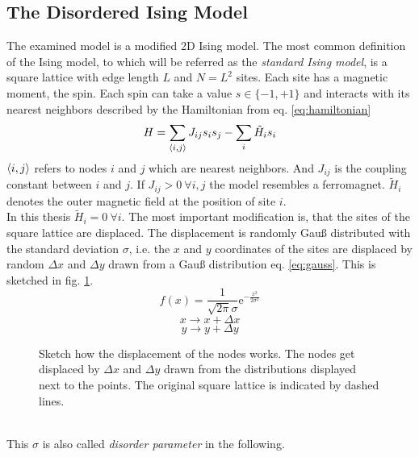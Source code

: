 \subsection{The Disordered Ising Model}
\label{ssec:isingmodel}
    The examined model is a modified 2D Ising model.
    The most common definition of the Ising model, to which will be referred
    as the \emph{standard Ising model}, is a square lattice with edge length \(L\) and
    \(N=L^2\) sites. Each site has a magnetic moment, the spin. Each
    spin can take a value \(s \in \{-1,+1\}\) and interacts with its
    nearest neighbors described by the Hamiltonian from eq. \eqref{eq:hamiltonian}
    \begin{equation}
        H = \sum_{\left< i,j \right>}J_{ij}s_{i}s_{j} - \sum_i \tilde{H}_i s_i
        \label{eq:hamiltonian}
    \end{equation}
    \(\left< i,j \right>\) refers to nodes \(i\) and \(j\) which are nearest
    neighbors. And \(J_{ij}\) is the coupling constant between \(i\) and
    \(j\). If \(J_{ij} > 0 \ \forall i,j\) the model resembles a ferromagnet.
    \(\tilde{H}_i\) denotes the outer magnetic field at the position of
    site \(i\).\\
    In this thesis \(\tilde{H}_i=0 \ \forall i\). The most important
    modification is, that the sites of the square lattice are displaced.
    The displacement is randomly Gauß distributed with the standard
    deviation \(\sigma\), i.e. the \(x\) and \(y\) coordinates of the
    sites are displaced by random \(\Delta x\) and \(\Delta y\) drawn
    from a Gauß distribution eq. \eqref{eq:gauss}.
    This is sketched in fig. \ref{fig:displacement}.
    \begin{equation}
        f(x)=\frac{1}{\sqrt{2\pi}\sigma}\mathrm{e}^{-\frac{x^2}{2\sigma^2}}
        \label{eq:gauss}
    \end{equation}
    \[x \to x + \Delta x\]
    \[y \to y + \Delta y\]
    \begin{figure}[htbp]
        \centering
        
        \caption[Sketch how the Displacement Works]
        {
            Sketch how the displacement of the nodes works. The nodes
            get displaced by \(\Delta x\) and \(\Delta y\) drawn from the
            distributions displayed next to the points. The original
            square lattice is indicated by dashed lines.
        }
        \label{fig:displacement}
    \end{figure}\\
    This \(\sigma\) is also called \emph{disorder parameter} in the following.
